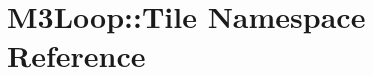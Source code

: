 \hypertarget{namespaceM3Loop_1_1Tile}{}\section{M3\+Loop\+:\+:Tile Namespace Reference}
\label{namespaceM3Loop_1_1Tile}

